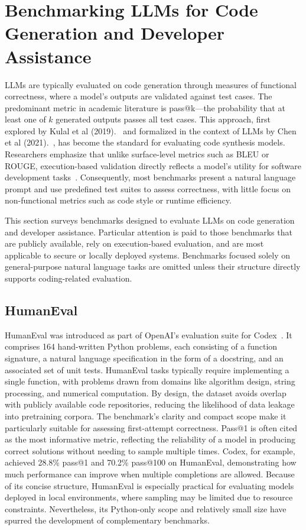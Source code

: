 \section{Benchmarking LLMs for Code Generation and Developer Assistance}
\label{sec:llm-benchmarks}
\glspl{LLM} are typically evaluated on code generation through measures of functional correctness, where a model's outputs are validated against test cases. The predominant metric in academic literature is pass@k—the probability that at least one of $k$ generated outputs passes all test cases. This approach, first explored by Kulal et al (2019).~\autocite{kulal2019spoc} and formalized in the context of \glspl{LLM} by Chen et al (2021).~\autocite{Chen2021}, has become the standard for evaluating code synthesis models. Researchers emphasize that unlike surface-level metrics such as BLEU or ROUGE, execution-based validation directly reflects a model's utility for software development tasks~\autocite{xu2022systematic}. Consequently, most benchmarks present a natural language prompt and use predefined test suites to assess correctness, with little focus on non-functional metrics such as code style or runtime efficiency.

This section surveys benchmarks designed to evaluate \glspl{LLM} on code generation and developer assistance. Particular attention is paid to those benchmarks that are publicly available, rely on execution-based evaluation, and are most applicable to secure or locally deployed systems. Benchmarks focused solely on general-purpose natural language tasks are omitted unless their structure directly supports coding-related evaluation.

\subsection{HumanEval}
HumanEval was introduced as part of OpenAI's evaluation suite for Codex~\autocite{Chen2021}. It comprises 164 hand-written Python problems, each consisting of a function signature, a natural language specification in the form of a docstring, and an associated set of unit tests. HumanEval tasks typically require implementing a single function, with problems drawn from domains like algorithm design, string processing, and numerical computation. By design, the dataset avoids overlap with publicly available code repositories, reducing the likelihood of data leakage into pretraining corpora. The benchmark’s clarity and compact scope make it particularly suitable for assessing first-attempt correctness. Pass@1 is often cited as the most informative metric, reflecting the reliability of a model in producing correct solutions without needing to sample multiple times. Codex, for example, achieved 28.8\% pass@1 and 70.2\% pass@100 on HumanEval, demonstrating how much performance can improve when multiple completions are allowed. Because of its concise structure, HumanEval is especially practical for evaluating models deployed in local environments, where sampling may be limited due to resource constraints. Nevertheless, its Python-only scope and relatively small size have spurred the development of complementary benchmarks.

